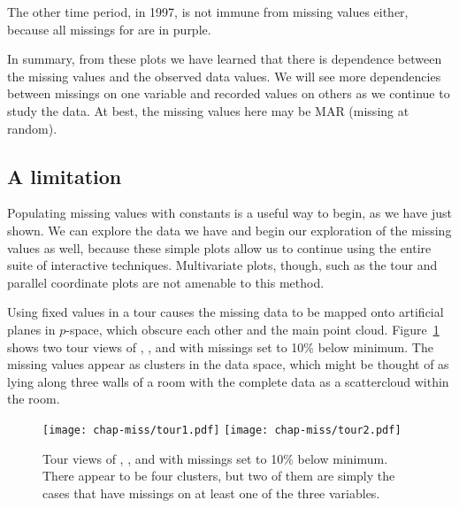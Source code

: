 The other time period, in 1997, is not immune from missing values
either, because all missings for  are in purple.

In summary, from these plots we have learned that there is dependence
between the missing values and the observed data values.  We will see
more dependencies between missings on one variable and recorded values
on others as we continue to study the data. At best, the missing values
here may be MAR (missing at random).

\subsection{A limitation}

Populating missing values with constants is a useful way to begin, as
we have just shown.  We can explore the data we have and begin
our exploration of the missing values as well, because these simple
plots allow us to continue using the entire suite of interactive
techniques.  Multivariate plots, though, such as the tour and parallel
coordinate plots are not amenable to this method.

Using fixed values in a tour causes the missing data to be mapped onto
artificial planes in $p$-space, which obscure each other and the main
point cloud. Figure~\ref{missing2} shows two tour views of , , and  with
missings set to 10\% below minimum. The missing values appear as
clusters in the data space, which might be thought of as lying along
three walls of a room with the complete data as a scattercloud within
the room.


 
\begin{figure}[htb]
\centerline{
  \texttt{[image: chap-miss/tour1.pdf]}
  \texttt{[image: chap-miss/tour2.pdf]}
}
\caption[Tour views with missings set to 10\% below minimum]{Tour
views of , , and
 with missings set to 10\% below minimum. There appear
to be four clusters, but two of them are simply the cases that have
missings on at least one of the three variables.}
\label{missing2}
\end{figure}

